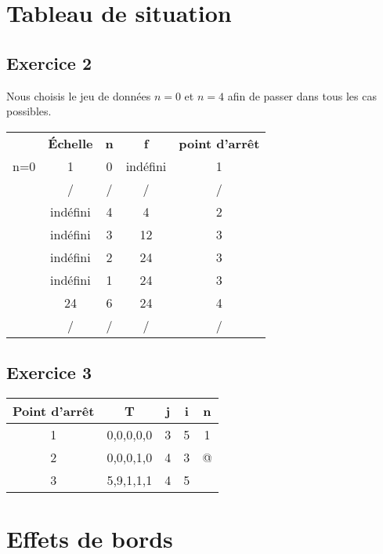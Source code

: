	\section{Tableau de situation}	
	\subsection{Exercice 2}

Nous choisis le jeu de données $n = 0$ et $n = 4$ afin de passer dans tous les cas possibles.
\begin{center}
\begin{tabular}{c  |  c  c  c  c  }
	&\textbf{\'Echelle} & \textbf{n} & \textbf{f} & \textbf{point d'arrêt}\\
n=0	&1 & 0 & indéfini & 1\\
	\hline
	&/ & / & / & /\\
	\hline
	\hline
	&indéfini & 4 & 4 & 2\\
	\hline
	&indéfini &  3 & 12 & 3\\	
	\hline
	&indéfini & 2 & 24 & 3\\
	\hline
	&indéfini & 1 & 24 & 3\\
	\hline
	&24 & 6 & 24 & 4\\
	\hline
	&/ & / & / & /\\
	\hline
\end{tabular}
\end{center}
\newpage
\subsection{Exercice 3}


\begin{center}
\begin{tabular}{c  |  c  c  c  c  }
	\textbf{Point d'arrêt }& \textbf{T} & \textbf{j} & \textbf{i} &\textbf{n}\\
	\hline
	1 & 0,0,0,0,0 & 3 & 5 & 1\\
	\hline
	2 & 0,0,0,1,0 & 4 & 3 & @\\
	\hline
	3 & 5,9,1,1,1&4&5&\\
	\hline
\end{tabular}
\end{center}
\newpage
\section{Effets de bords}
